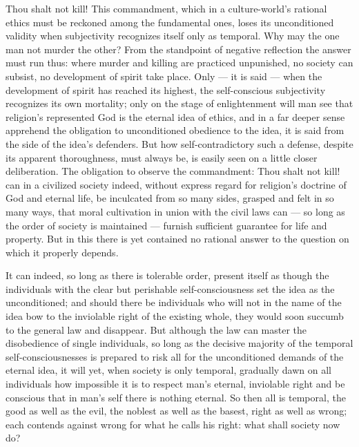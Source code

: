 \documentclass[12pt]{book}
\begin{document}
Thou shalt not kill! This commandment, which in a culture-world's rational ethics must be reckoned
among the fundamental ones, loses its unconditioned validity when subjectivity recognizes itself
only as temporal. Why may the one man not murder the other? From the standpoint of negative
reflection the answer must run thus: where murder and killing are practiced unpunished, no society
can subsist, no development of spirit take place. Only --- it is said --- when the development of
spirit has reached its highest, the self-conscious subjectivity recognizes its own mortality; only
on the stage of enlightenment will man see that religion's represented God is the eternal idea of
ethics, and in a far deeper sense apprehend the obligation to unconditioned obedience to the idea,
it is said from the side of the idea's defenders. But how self-contradictory such a defense, despite
its apparent thoroughness, must always be, is easily seen on a little closer deliberation. The
obligation to observe the commandment: Thou shalt not kill! can in a civilized society indeed,
without express regard for religion's doctrine of God and eternal life, be inculcated from so many
sides, grasped and felt in so many ways, that moral cultivation in union with the civil laws can
--- so long as the order of society is maintained --- furnish sufficient guarantee for life and
property. But in this there is yet contained no rational answer to the question on which it
properly depends.

It can indeed, so long as there is tolerable order, present itself as though the individuals with
the clear but perishable self-consciousness set the idea as the unconditioned; and should there be
individuals who will not in the name of the idea bow to the inviolable right of the existing whole,
they would soon succumb to the general law and disappear. But although the law can master the
disobedience of single individuals, so long as the decisive majority of the temporal
self-consciousnesses is prepared to risk all for the unconditioned demands of the eternal idea, it
will yet, when society is only temporal, gradually dawn on all individuals how impossible it is to
respect man's eternal, inviolable right and be conscious that in man's self there is nothing
eternal. So then all is temporal, the good as well as the evil, the noblest as well as the basest,
right as well as wrong; each contends against wrong for what he calls his right: what shall society
now do?
\end{document}
